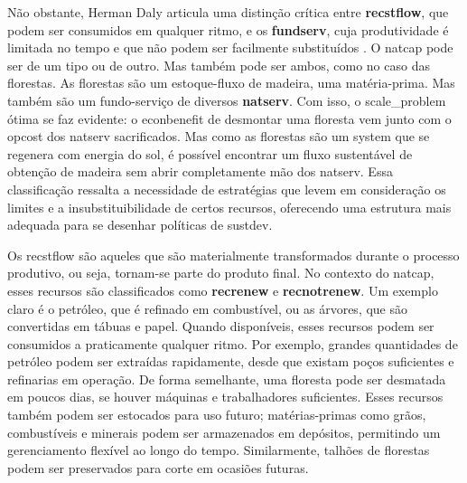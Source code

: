 \documentclass[./main.tex]{subfiles}
\begin{document}
\par Não obstante, Herman Daly articula uma distinção crítica entre \textbf{\gls{recstflow}}, que podem ser consumidos em qualquer ritmo, e os \textbf{\gls{fundserv}}, cuja produtividade é limitada no tempo e que não podem ser facilmente substituídos \cite{daly2011}. O \gls{natcap} pode ser de um tipo ou de outro. Mas também pode ser ambos, como no caso das florestas. As florestas são um estoque-fluxo de madeira, uma matéria-prima. Mas também são um fundo-serviço de diversos \textbf{\gls{natserv}}. Com isso, o \gls{scale_problem} ótima se faz evidente: o \gls{econbenefit} de desmontar uma floresta vem junto com o \gls{opcost} dos \gls{natserv} sacrificados. Mas como as florestas são um \gls{system} que se regenera com energia do sol, é possível encontrar um fluxo sustentável de obtenção de madeira sem abrir completamente mão dos \gls{natserv}. Essa classificação ressalta a necessidade de estratégias que levem em consideração os limites e a insubstituibilidade de certos recursos, oferecendo uma estrutura mais adequada para se desenhar políticas de \gls{sustdev}.

\par Os \gls{recstflow} são aqueles que são materialmente transformados durante o processo produtivo, ou seja, tornam-se parte do produto final. No contexto do \gls{natcap}, esses recursos são classificados como \textbf{\gls{recrenew}} e \textbf{\gls{recnotrenew}}. Um exemplo claro é o petróleo, que é refinado em combustível, ou as árvores, que são convertidas em tábuas e papel. Quando disponíveis, esses recursos podem ser consumidos a praticamente qualquer ritmo. Por exemplo, grandes quantidades de petróleo podem ser extraídas rapidamente, desde que existam poços suficientes e refinarias em operação. De forma semelhante, uma floresta pode ser desmatada em poucos dias, se houver máquinas e trabalhadores suficientes. Esses recursos também podem ser estocados para uso futuro; matérias-primas como grãos, combustíveis e minerais podem ser armazenados em depósitos, permitindo um gerenciamento flexível ao longo do tempo. Similarmente, talhões de florestas podem ser preservados para corte em ocasiões futuras. 
\end{document}
